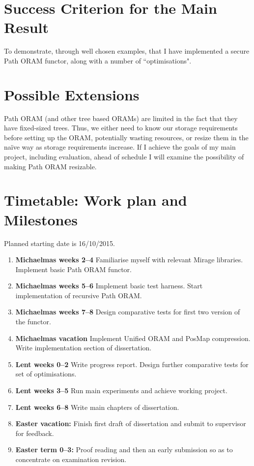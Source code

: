 \documentclass[12pt,a4paper,twoside]{article}
\begin{document}
\section*{Success Criterion for the Main Result}

To demonstrate, through well chosen examples, that I have implemented a secure Path ORAM functor, along with a number of ``optimisations".

\section*{Possible Extensions}

Path ORAM (and other tree based ORAMs) are limited in the fact that they have fixed-sized trees. Thus, we either need to know our storage requirements before setting up the ORAM, potentially wasting resources, or resize them in the na\"ive way as storage requirements increase. If I achieve the goals of my main project, including evaluation, ahead of schedule I will examine the possibility of making Path ORAM resizable.

\section*{Timetable: Work plan and Milestones}

Planned starting date is 16/10/2015.

\begin{enumerate}

\item {\bf Michaelmas weeks 2--4} Familiarise myself with relevant Mirage libraries. Implement basic Path ORAM functor.

\item {\bf Michaelmas weeks 5--6} Implement basic test harness. Start implementation of recursive Path ORAM.

\item {\bf Michaelmas weeks 7--8} Design comparative tests for first two version of the functor.

\item {\bf Michaelmas vacation} Implement Unified ORAM and PosMap compression. Write implementation section of dissertation. 

\item {\bf Lent weeks 0--2} Write progress report. Design further comparative tests for set of optimisations.

\item {\bf Lent weeks 3--5} Run main experiments and achieve working project.

\item {\bf Lent weeks 6--8} Write main chapters of dissertation.

\item {\bf Easter vacation:} Finish first draft of dissertation and submit to supervisor for feedback.

\item {\bf Easter term 0--3:} Proof reading and then an early submission
  so as to concentrate on examination revision.

\end{enumerate}
\end{document}
